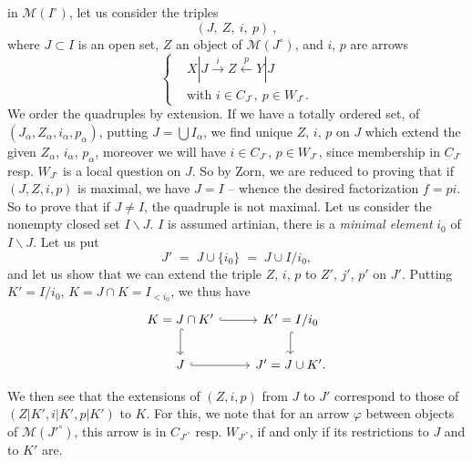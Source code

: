 \documentclass[11pt]{article}
\newcommand{\printedpage}[1]{\marginpar{\footnotesize p.~#1}}
\newcommand{\msp}[1]{\marginpar{\footnotesize [#1]}}
\begin{document}
\printedpage{24}

\msp{45}in $\mathcal{M}(I^\circ)$, let us consider the triples
\[
(J,\ Z,\ i,\ p)\ ,
\]
where $J\subset I$ is an open set, $Z$ an object of $\mathcal{M}(J^\circ)$, and $i$, $p$ are arrows
\[
\left\{
\begin{aligned}
& X|J \xrightarrow{\ i\ } Z \xleftarrow{\ p\ } Y|J \\
& \text{with } i\in C_{J^\circ},\ p\in W_{J^\circ}.
\end{aligned}
\right.
\]
We order the quadruples by extension. If we have a totally ordered set, of $(J_\alpha,Z_\alpha,i_\alpha,p_\alpha)$, putting $J=\bigcup I_\alpha$, we find unique $Z$, $i$, $p$ on $J$ which extend %
the given $Z_\alpha$, $i_\alpha$, $p_\alpha$, moreover we will have $i\in C_{J^\circ}$, $p\in W_{J^\circ}$, since membership in $C_{J^\circ}$ resp. $W_{J^\circ}$ is a local question on $J$. So by Zorn, we are reduced to proving that if $(J,Z,i,p)$ is maximal, we have $J=I$ – whence the desired factorization $f=pi$. So to prove that if %
$J\neq I$, the quadruple is not maximal. Let us consider the nonempty closed set $I\backslash J$. $I$ is assumed artinian, there is a \textit{minimal element} $i_0$ of $I\backslash J$. Let us put
\msp{46}
\[
J' \;=\; J\cup\{i_0\} \;=\; J\cup I/i_0,
\]
and let us show that we can extend the triple $Z$, $i$, $p$ to $Z'$, $j'$, $p'$ on $J'$. Putting $K'=I/i_0$, %
$K=J\cap K=I_{<i_0}$, we thus have %
\[
\begin{tikzcd}
K=J\cap K' \arrow[r, hook] \arrow[d, hook] & K'=I/i_0 \arrow[d, hook] \\
J \arrow[r, hook] & J'=J\cup K'.
\end{tikzcd}
\]

We then see that the extensions of $(Z,i,p)$ from $J$ to $J'$ correspond to those of $(Z|K',i|K',p|K')$ to $K$. For this, we note that for an arrow $\varphi$ between objects of $\mathcal{M}(J'^\circ)$, this arrow is in $C_{J'^\circ}$ resp. $W_{J'^\circ}$, if and only if its restrictions to $J$ and to $K'$ are.
\end{document}
